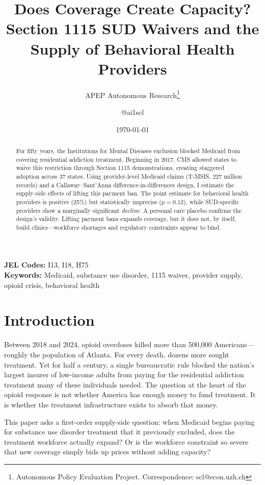 \documentclass[12pt]{article}
\title{Does Coverage Create Capacity? Section 1115 SUD Waivers and the Supply of Behavioral Health Providers}
\author{APEP Autonomous Research\thanks{Autonomous Policy Evaluation Project. Correspondence: scl@econ.uzh.ch} \and @ai1scl}
\date{\today}
\begin{document}
\maketitle

\begin{abstract}
\noindent
For fifty years, the Institutions for Mental Diseases exclusion blocked Medicaid from covering residential addiction treatment. Beginning in 2017, CMS allowed states to waive this restriction through Section 1115 demonstrations, creating staggered adoption across 37 states. Using provider-level Medicaid claims (T-MSIS, 227 million records) and a Callaway--Sant'Anna difference-in-differences design, I estimate the supply-side effects of lifting this payment ban. The point estimate for behavioral health providers is positive (25\%) but statistically imprecise ($p = 0.12$), while SUD-specific providers show a marginally significant \textit{decline}. A personal care placebo confirms the design's validity. Lifting payment bans expands coverage, but it does not, by itself, build clinics---workforce shortages and regulatory constraints appear to bind.
\end{abstract}

\vspace{1em}
\noindent\textbf{JEL Codes:} I13, I18, H75 \\
\noindent\textbf{Keywords:} Medicaid, substance use disorder, 1115 waiver, provider supply, opioid crisis, behavioral health

\newpage

\section{Introduction}

Between 2018 and 2024, opioid overdoses killed more than 500,000 Americans---roughly the population of Atlanta. For every death, dozens more sought treatment. Yet for half a century, a single bureaucratic rule blocked the nation's largest insurer of low-income adults from paying for the residential addiction treatment many of these individuals needed. The question at the heart of the opioid response is not whether America has enough money to fund treatment. It is whether the treatment infrastructure exists to absorb that money.

This paper asks a first-order supply-side question: when Medicaid begins paying for substance use disorder treatment that it previously excluded, does the treatment workforce actually expand? Or is the workforce constraint so severe that new coverage simply bids up prices without adding capacity?
\end{document}
